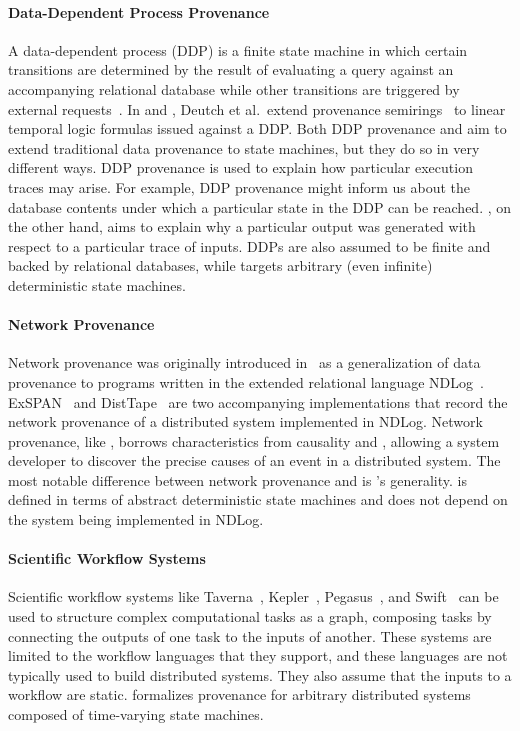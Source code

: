 \paragraph{Data-Dependent Process Provenance}
A data-dependent process (DDP) is a finite state machine in which certain
transitions are determined by the result of evaluating a query against an
accompanying relational database while other transitions are triggered by
external requests~\cite{deutch2014provenance, deutch2015provenance}. In
\cite{deutch2014provenance} and \cite{deutch2015provenance}, Deutch et al.\
extend provenance semirings~\cite{green2007provenance} to linear temporal logic
formulas issued against a DDP.
%
Both DDP provenance and \watprovenance{} aim to extend traditional data
provenance to state machines, but they do so in very different ways. DDP
provenance is used to explain how particular execution traces may arise. For
example, DDP provenance might inform us about the database contents under which
a particular state in the DDP can be reached. \Watprovenance{}, on the other
hand, aims to explain why a particular output was generated with respect to a
particular trace of inputs. DDPs are also assumed to be finite and backed by
relational databases, while \watprovenance{} targets arbitrary (even infinite)
deterministic state machines.

\paragraph{Network Provenance}
Network provenance was originally introduced in~\cite{zhou2010efficient} as a
generalization of data provenance to programs written in the extended
relational language NDLog~\cite{loo2006design}. ExSPAN~\cite{zhou2010efficient}
and DistTape~\cite{zhou2012distributed} are two accompanying implementations
that record the network provenance of a distributed system implemented in
NDLog.  Network provenance, like \watprovenance{}, borrows characteristics from
causality and \whyprovenance{}, allowing a system developer to discover the
precise causes of an event in a distributed system. The most notable difference
between network provenance and \watprovenance{} is \watprovenance{}'s
generality. \Watprovenance{} is defined in terms of abstract deterministic
state machines and does not depend on the system being implemented in NDLog.

\paragraph{Scientific Workflow Systems}
Scientific workflow systems like Taverna~\cite{wolstencroft2013taverna},
Kepler~\cite{altintas2006provenance}, Pegasus~\cite{kim2008provenance}, and
Swift~\cite{wozniak2013swift} can be used to structure complex computational
tasks as a graph, composing tasks by connecting the outputs of one task to the
inputs of another. These systems are limited to the workflow languages that
they support, and these languages are not typically used to build distributed
systems. They also assume that the inputs to a workflow are static.
\Watprovenance{} formalizes provenance for arbitrary distributed systems
composed of time-varying state machines.

